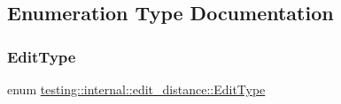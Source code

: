 \subsection{Enumeration Type Documentation}
\mbox{\label{namespacetesting_1_1internal_1_1edit__distance_ad46aa6da12aec1a3f166310478b53a08}} 
\subsubsection{\texorpdfstring{EditType}{EditType}}
{\footnotesize\ttfamily enum \mbox{\hyperlink{namespacetesting_1_1internal_1_1edit__distance_ad46aa6da12aec1a3f166310478b53a08}{testing\+::internal\+::edit\+\_\+distance\+::\+Edit\+Type}}}

